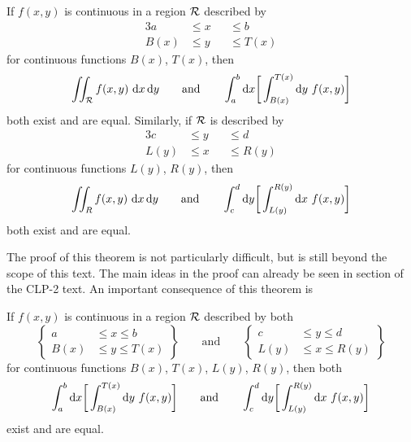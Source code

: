 \begin{theorem}
If $f(x,y)$ is continuous in a region $\mathcal{R}$ described by
\begin{alignat*}{3}
a&\le x&&\le b \\
B(x)&\le y&&\le T(x)
\end{alignat*}
for continuous functions $B(x)$, $T(x)$, then
\begin{equation*}
\dblInt_\cR f(x,y)\ \dee{x}\,\dee{y}\qquad\text{and}\qquad
\int_a^b \dee{x} \bigg[\int_{B(x)}^{T(x)}\dee{y}\  f(x,y)\bigg]
\end{equation*}
both exist and are equal. 
Similarly, if $\mathcal{R}$ is described by
\begin{alignat*}{3}
c&\le y&&\le d\\
L(y)&\le x&&\le R(y)
\end{alignat*}
for continuous functions $L(y)$, $R(y)$, then
\begin{equation*}
\dblInt_R f(x,y)\ \dee{x}\,\dee{y}\qquad\text{and}\qquad
\int_c^d \dee{y} \bigg[\int_{L(y)}^{R(y)}\dee{x}\  f(x,y)\bigg]
\end{equation*}
both exist and are equal.
\end{theorem}


The proof of this theorem is not particularly difficult, but is still 
beyond the scope of this text. The main ideas in the proof can already
be seen in section  of the CLP-2 text.
An important consequence of this theorem is
\begin{theorem}[Fubini]
If $f(x,y)$ is continuous in a region $\mathcal{R}$ described by both
\begin{equation*}
\left\{\begin{aligned}
   a&\le x\le b \\
B(x)&\le y\le T(x)
\end{aligned}\right\}
\qquad\text{and}\qquad
\left\{
\begin{aligned}
c&\le y\le d\\
L(y)&\le x\le R(y)
\end{aligned}
\right\}
\end{equation*}
for continuous functions $B(x)$, $T(x)$, $L(y)$, $R(y)$, then
both
\begin{equation*}
\int_a^b \mathrm{d}x \bigg[\int_{B(x)}^{T(x)}\mathrm{d}y\  f(x,y)\bigg]
\qquad\text{and}\qquad
\int_c^d \mathrm{d}y \bigg[\int_{L(y)}^{R(y)}\mathrm{d}x\  f(x,y)\bigg]
\end{equation*}
exist and are equal.
\end{theorem}

